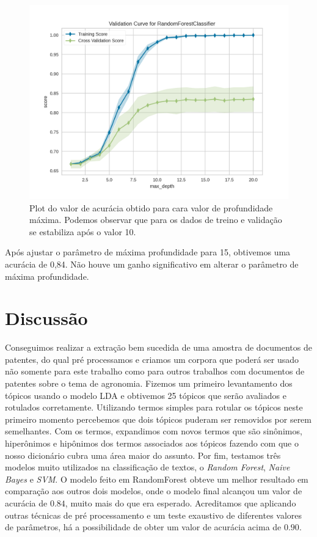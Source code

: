 \begin{figure}[ht!]
	\centering
	\includegraphics[scale=0.8]{imagens/validation_curve_max_depth_rf.png}
	\caption{Plot do valor de acurácia obtido para cara valor de profundidade máxima. Podemos observar que para os dados de treino e validação se estabiliza após o valor 10.
			 \label{validation_curve_max_depth_rf}}
\end{figure}

Após ajustar o parâmetro de máxima profundidade para 15, obtivemos uma acurácia de 0,84. Não houve um ganho significativo em alterar o parâmetro de máxima profundidade.

\section{Discussão}

Conseguimos realizar a extração bem sucedida de uma amostra de documentos de patentes, do qual pré processamos e criamos um corpora que poderá ser usado não somente para este trabalho como para outros trabalhos com documentos de patentes sobre o tema de agronomia. Fizemos um primeiro levantamento dos tópicos usando o modelo LDA e obtivemos 25 tópicos que serão avaliados e rotulados corretamente. 
Utilizando termos simples para rotular os tópicos neste primeiro momento percebemos que dois tópicos puderam ser removidos por serem semelhantes. Com os termos, expandimos com novos termos que são sinônimos, hiperônimos e hipônimos dos termos associados aos tópicos fazendo com que o nosso dicionário cubra uma área maior do assunto. 
Por fim, testamos três modelos muito utilizados na classificação de textos, o \textit{Random Forest}, \textit{Naive Bayes} e \textit{SVM}. O modelo feito em RandomForest obteve um melhor resultado em comparação aos outros dois modelos, onde o modelo final  alcançou um valor de acurácia de $0.84$, muito mais do que era esperado. 
Acreditamos que aplicando outras técnicas de pré processamento e um teste exaustivo de diferentes valores de parâmetros, há a possibilidade de obter um valor de acurácia acima de $0.90$.

